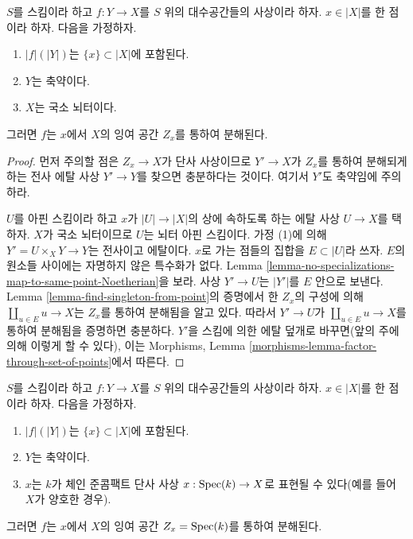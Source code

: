 \begin{lemma}
\label{lemma-factor-through-residual-space-Noetherian}
$S$를 스킴이라 하고 $f : Y \to X$를 $S$ 위의 대수공간들의 사상이라
하자. $x \in |X|$를 한 점이라 하자. 다음을 가정하자.
\begin{enumerate}
\item $|f|(|Y|)$는 $\{x\} \subset |X|$에 포함된다.
\item $Y$는 축약이다.
\item $X$는 국소 뇌터이다.
\end{enumerate}
그러면 $f$는 $x$에서 $X$의 잉여 공간 $Z_x$를 통하여 분해된다.
\end{lemma}

\begin{proof}
먼저 주의할 점은 $Z_x \to X$가 단사 사상이므로 $Y' \to X$가
$Z_x$를 통하여 분해되게 하는 전사 에탈 사상 $Y' \to Y$를 찾으면
충분하다는 것이다. 여기서 $Y'$도 축약임에 주의하라.

\medskip\noindent
$U$를 아핀 스킴이라 하고 $x$가 $|U| \to |X|$의 상에 속하도록 하는
에탈 사상 $U \to X$를 택하자. $X$가 국소 뇌터이므로 $U$는 뇌터
아핀 스킴이다. 가정 (1)에 의해
$Y' = U \times_X Y \to Y$는 전사이고 에탈이다. $x$로 가는 점들의
집합을 $E \subset |U|$라 쓰자.
$E$의 원소들 사이에는 자명하지 않은 특수화가 없다. Lemma
\ref{lemma-no-specializations-map-to-same-point-Noetherian}을 보라.
사상 $Y' \to U$는 $|Y'|$를 $E$ 안으로 보낸다. Lemma
\ref{lemma-find-singleton-from-point}의 증명에서 한 $Z_x$의 구성에 의해
$\coprod_{u \in E} u \to X$는 $Z_x$를 통하여 분해됨을 알고 있다.
따라서 $Y' \to U$가 $\coprod_{u \in E} u \to X$를 통하여 분해됨을
증명하면 충분하다. $Y'$을 스킴에 의한 에탈 덮개로 바꾸면(앞의 주에
의해 이렇게 할 수 있다), 이는 Morphisms, Lemma
\ref{morphisms-lemma-factor-through-set-of-points}에서 따른다.
\end{proof}

\begin{lemma}
\label{lemma-factor-through-residual-space-decent}
$S$를 스킴이라 하고 $f : Y \to X$를 $S$ 위의 대수공간들의 사상이라
하자. $x \in |X|$를 한 점이라 하자. 다음을 가정하자.
\begin{enumerate}
\item $|f|(|Y|)$는 $\{x\} \subset |X|$에 포함된다.
\item $Y$는 축약이다.
\item $x$는 $k$가 체인 준콤팩트 단사 사상
$x : \mathop{\mathrm{Spec}}(k) \to X$로 표현될 수 있다(예를 들어 $X$가 양호한 경우).
\end{enumerate}
그러면 $f$는 $x$에서 $X$의 잉여 공간
$Z_x = \mathop{\mathrm{Spec}}(k)$를 통하여 분해된다.
\end{lemma}

